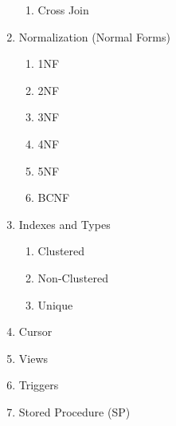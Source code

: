 \documentclass[11pt]{article}
\begin{document}
\begin{enumerate}
\begin{enumerate}
   \item Cross Join
   \end{enumerate}
	\item Normalization (Normal Forms)
	\begin{enumerate}
		\item 1NF
		\item 2NF
		\item 3NF
		\item 4NF
		\item 5NF
		\item BCNF		
	\end{enumerate}
\item Indexes and Types
\begin{enumerate}
	\item Clustered
	\item Non-Clustered
	\item Unique
\end{enumerate}
\item Cursor
\item Views
\item Triggers
\item Stored Procedure (SP)
\end{enumerate}
\end{document}
